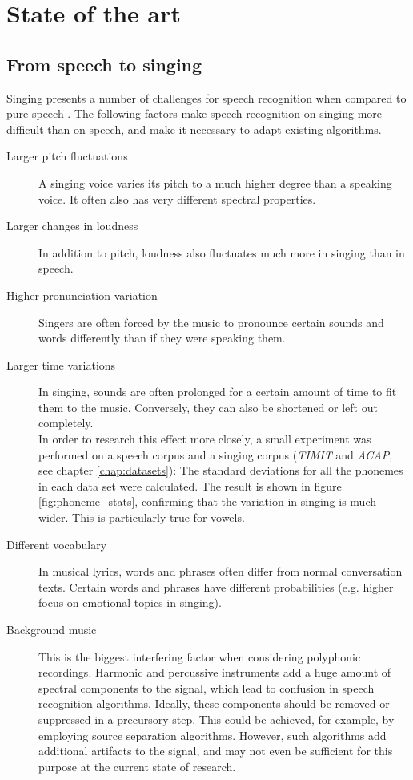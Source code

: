 
\chapter{State of the art}	\label{chap:sota}
\section{From speech to singing} \label{sec:sota_speechtosinging}
Singing presents a number of challenges for speech recognition when compared to pure speech \cite{loscos} \cite{goto_alignment} \cite{kruspe_kws1}. The following factors make speech recognition on singing more difficult than on speech, and make it necessary to adapt existing algorithms.
\begin{description}
 \item[Larger pitch fluctuations] A singing voice varies its pitch to a much higher degree than a speaking voice. It often also has very different spectral properties.
 \item[Larger changes in loudness] In addition to pitch, loudness also fluctuates much more in singing than in speech.
 \item[Higher pronunciation variation] Singers are often forced by the music to pronounce certain sounds and words differently than if they were speaking them.
 \item[Larger time variations] In singing, sounds are often prolonged for a certain amount of time to fit them to the music. Conversely, they can also be shortened or left out completely.\\
 In order to research this effect more closely, a small experiment was performed on a speech corpus and a singing corpus (\textit{TIMIT} and \textit{ACAP}, see chapter \ref{chap:datasets}): The standard deviations for all the phonemes in each data set were calculated. The result is shown in figure \ref{fig:phoneme_stats}, confirming that the variation in singing is much wider. This is particularly true for vowels.
 \item[Different vocabulary] In musical lyrics, words and phrases often differ from normal conversation texts. Certain words and phrases have different probabilities (e.g. higher focus on emotional topics in singing).
 \item[Background music] This is the biggest interfering factor when considering polyphonic recordings. Harmonic and percussive instruments add a huge amount of spectral components to the signal, which lead to confusion in speech recognition algorithms. Ideally, these components should be removed or suppressed in a precursory step. This could be achieved, for example, by employing source separation algorithms. However, such algorithms add additional artifacts to the signal, and may not even be sufficient for this purpose at the current state of research.\\

\end{description}
